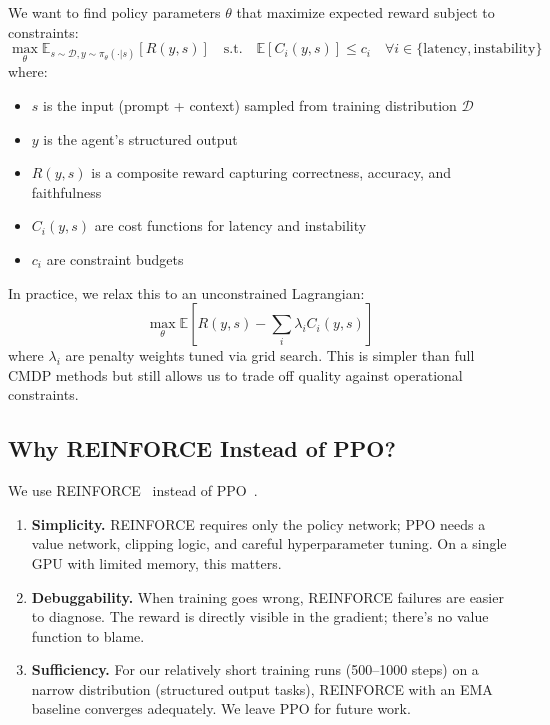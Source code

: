\documentclass[11pt]{article}
\begin{document}
We want to find policy parameters $\theta$ that maximize expected reward subject to constraints:
\begin{equation}
\max_{\theta} \mathbb{E}_{s \sim \mathcal{D}, y \sim \pi_\theta(\cdot|s)} [R(y, s)]
\quad \text{s.t.} \quad
\mathbb{E}[C_i(y, s)] \leq c_i \quad \forall i \in \{\text{latency}, \text{instability}\}
\end{equation}
where:
\begin{itemize}[leftmargin=12pt]
    \item $s$ is the input (prompt + context) sampled from training distribution $\mathcal{D}$
    \item $y$ is the agent's structured output
    \item $R(y, s)$ is a composite reward capturing correctness, accuracy, and faithfulness
    \item $C_i(y, s)$ are cost functions for latency and instability
    \item $c_i$ are constraint budgets
\end{itemize}

In practice, we relax this to an unconstrained Lagrangian:
\begin{equation}
\max_{\theta} \mathbb{E} \left[ R(y, s) - \sum_i \lambda_i C_i(y, s) \right]
\end{equation}
where $\lambda_i$ are penalty weights tuned via grid search.
This is simpler than full CMDP methods but still allows us to trade off quality against operational constraints.

\subsection{Why REINFORCE Instead of PPO?}

We use REINFORCE~\citep{williams1992reinforce} instead of PPO~\citep{schulman2017ppo}.

\begin{enumerate}[leftmargin=12pt]
    \item \textbf{Simplicity.} REINFORCE requires only the policy network; PPO needs a value network, clipping logic, and careful hyperparameter tuning.  On a single GPU with limited memory, this matters.

    \item \textbf{Debuggability.} When training goes wrong, REINFORCE failures are easier to diagnose.  The reward is directly visible in the gradient; there's no value function to blame.

    \item \textbf{Sufficiency.} For our relatively short training runs (500--1000 steps) on a narrow distribution (structured output tasks), REINFORCE with an EMA baseline converges adequately.  We leave PPO for future work.
\end{enumerate}
\end{document}
